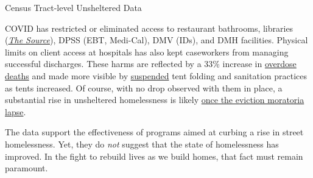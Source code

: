 \documentclass[11pt]{article}
\begin{document}
\begin{table}
\caption{Census Tract-level Unsheltered Data}
\caption*{$^{\rm a}$Tract counted by professional outreach teams
31 March and volunteers 14 April; contains Pan Pacific Park and its emergency 
shelter. $^{\rm b}$Park La Brea gated community; counted 11 April.}
\label{tbl:allTracts}
\end{table}

COVID has restricted or eliminated access to restaurant bathrooms, libraries 
(\href{https://www.lapl.org/homeless-resources/the-source}{\it The Source}), DPSS 
(EBT, Medi-Cal), DMV (IDs), and DMH facilities. Physical limits on client access at 
hospitals has also kept caseworkers from managing successful discharges. These harms 
are reflected by a 33\% increase in 
\href{http://publichealth.lacounty.gov/chie/reports/HomelessMortality2020_CHIEBrief_Final.pdf}{overdose deaths} and made more visible by \href{https://clkrep.lacity.org/onlinedocs/2020/20-0147_misc_3-17-20_p.pdf}{suspended}
tent folding and sanitation practices as tents increased.
Of course, with no drop observed with them in place, a substantial rise in unsheltered homelessness
is likely \href{https://www.latimes.com/california/story/2021-01-12/new-report-foresees-tens-of-thousands-losing-homes-by-2023}{once the eviction moratoria lapse}.

The data support the effectiveness of programs aimed at curbing a rise in street homelessness.
Yet, they do {\it not} suggest that the state of homelessness has improved. In the fight to rebuild 
lives as we build homes, that fact must remain paramount.

\end{document}
